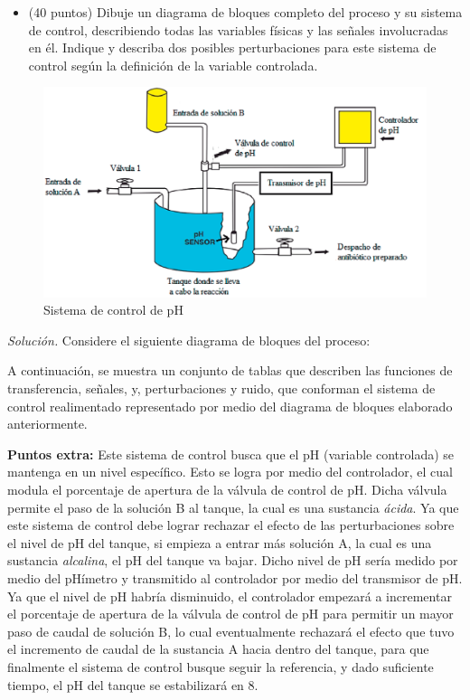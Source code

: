 \begin{itemize}
    \item (40 puntos) Dibuje un diagrama de bloques completo del proceso y su sistema de control, describiendo todas las variables físicas y las señales involucradas en él. 
        Indique y describa dos posibles perturbaciones para este sistema de control según la definición de la variable controlada.
\end{itemize}

\begin{figure}[!h]
    \centering
    \includegraphics[width = 0.5\linewidth]{figs/fig1.png}
    \caption{Sistema de control de pH}
    \label{fig1}
\end{figure}

\pagebreak

\textit{Solución.} Considere el siguiente diagrama de bloques del proceso:



A continuación, se muestra un conjunto de tablas que describen las funciones de transferencia, señales, y, perturbaciones y ruido, que conforman el sistema de control realimentado representado por medio del diagrama de bloques elaborado anteriormente.


\pagebreak

\pagebreak


\vspace{1em}

\begin{mdframed}
\textbf{Puntos extra:} Este sistema de control busca que el pH (variable controlada) se mantenga en un nivel específico. Esto se logra por medio del controlador, el cual modula el porcentaje de apertura de la válvula de control de pH. Dicha válvula permite el paso de la solución B al tanque, la cual es una sustancia \textit{ácida}. Ya que este sistema de control debe lograr rechazar el efecto de las perturbaciones sobre el nivel de pH del tanque, si empieza a entrar más solución A, la cual es una sustancia \textit{alcalina}, el pH del tanque va bajar. Dicho nivel de pH sería medido por medio del pHímetro y transmitido al controlador por medio del transmisor de pH. Ya que el nivel de pH habría disminuido, el controlador empezará a incrementar el porcentaje de apertura de la válvula de control de pH para permitir un mayor paso de caudal de solución B, lo cual eventualmente rechazará el efecto que tuvo el incremento de caudal de la sustancia A hacia dentro del tanque, para que finalmente el sistema de control busque seguir la referencia, y dado suficiente tiempo, el pH del tanque se estabilizará en 8.
\end{mdframed}

\pagebreak

